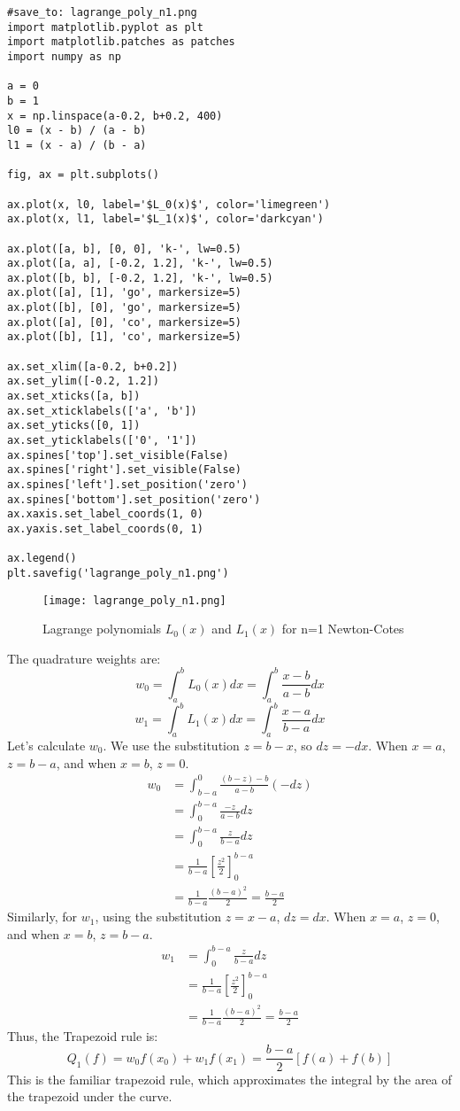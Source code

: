 \documentclass{article}
\begin{document}
\begin{verbatim}
#save_to: lagrange_poly_n1.png
import matplotlib.pyplot as plt
import matplotlib.patches as patches
import numpy as np

a = 0
b = 1
x = np.linspace(a-0.2, b+0.2, 400)
l0 = (x - b) / (a - b)
l1 = (x - a) / (b - a)

fig, ax = plt.subplots()

ax.plot(x, l0, label='$L_0(x)$', color='limegreen')
ax.plot(x, l1, label='$L_1(x)$', color='darkcyan')

ax.plot([a, b], [0, 0], 'k-', lw=0.5)
ax.plot([a, a], [-0.2, 1.2], 'k-', lw=0.5)
ax.plot([b, b], [-0.2, 1.2], 'k-', lw=0.5)
ax.plot([a], [1], 'go', markersize=5)
ax.plot([b], [0], 'go', markersize=5)
ax.plot([a], [0], 'co', markersize=5)
ax.plot([b], [1], 'co', markersize=5)

ax.set_xlim([a-0.2, b+0.2])
ax.set_ylim([-0.2, 1.2])
ax.set_xticks([a, b])
ax.set_xticklabels(['a', 'b'])
ax.set_yticks([0, 1])
ax.set_yticklabels(['0', '1'])
ax.spines['top'].set_visible(False)
ax.spines['right'].set_visible(False)
ax.spines['left'].set_position('zero')
ax.spines['bottom'].set_position('zero')
ax.xaxis.set_label_coords(1, 0)
ax.yaxis.set_label_coords(0, 1)

ax.legend()
plt.savefig('lagrange_poly_n1.png')
\end{verbatim}

\begin{figure}[h]
    \centering
    \texttt{[image: lagrange\_poly\_n1.png]}
    \caption{Lagrange polynomials $L_0(x)$ and $L_1(x)$ for n=1 Newton-Cotes}
    \label{fig:lagrange_poly_n1}
\end{figure}

The quadrature weights are:
\[
w_0 = \int_a^b L_0(x) dx = \int_a^b \frac{x - b}{a - b} dx
\]
\[
w_1 = \int_a^b L_1(x) dx = \int_a^b \frac{x - a}{b - a} dx
\]
Let's calculate $w_0$. We use the substitution $z = b - x$, so $dz = -dx$. When $x=a$, $z = b-a$, and when $x=b$, $z=0$.
\begin{align*}
w_0 &= \int_{b-a}^{0} \frac{(b-z) - b}{a - b} (-dz) \\
    &= \int_{0}^{b-a} \frac{-z}{a - b} dz \\
    &= \int_{0}^{b-a} \frac{z}{b - a} dz \\
    &= \frac{1}{b - a} \left[ \frac{z^2}{2} \right]_0^{b-a} \\
    &= \frac{1}{b - a} \frac{(b-a)^2}{2} = \frac{b - a}{2}
\end{align*}
Similarly, for $w_1$, using the substitution $z = x - a$, $dz = dx$. When $x=a$, $z = 0$, and when $x=b$, $z = b-a$.
\begin{align*}
w_1 &= \int_{0}^{b-a} \frac{z}{b - a} dz \\
    &= \frac{1}{b - a} \left[ \frac{z^2}{2} \right]_0^{b-a} \\
    &= \frac{1}{b - a} \frac{(b-a)^2}{2} = \frac{b - a}{2}
\end{align*}
Thus, the Trapezoid rule is:
\[
Q_1(f) = w_0 f(x_0) + w_1 f(x_1) = \frac{b - a}{2} [f(a) + f(b)]
\]
This is the familiar trapezoid rule, which approximates the integral by the area of the trapezoid under the curve.
\end{document}

